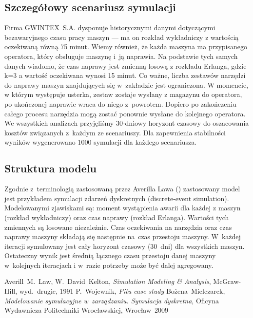 \documentclass[12pt, a4paper, oneside]{mwart} %
\begin{document}
\subsection{Szczegółowy scenariusz symulacji}

Firma GWINTEX~S.A. dysponuje historycznymi danymi dotyczącymi bezawaryjnego czasu pracy maszyn --- ma on rozkład wykładniczy z wartością oczekiwaną równą 75 minut. Wiemy również, że każda maszyna ma przypisanego operatora, który obsługuje maszynę i~ją naprawia. Na podstawie tych samych danych wiadomo, że czas naprawy jest zmienną losową z rozkładu Erlanga, gdzie k=3 a wartość oczekiwana wynosi 15 minut. Co ważne, liczba zestawów narzędzi do naprawy maszyn znajdujących się w~zakładzie jest ograniczona. W momencie, w którym występuje usterka, zestaw zostaje wysłany z magazynu do operatora, po ukończonej naprawie wraca do niego z~powrotem. Dopiero po zakończeniu całego procesu narzędzia mogą zostać ponownie wysłane do kolejnego operatora. We wszystkich analizach przyjęliśmy 30-dniowy horyzont czasowy do oszacowania kosztów związanych z~każdym ze scenariuszy. Dla zapewnienia stabilności wyników wygenerowano 1000 symulacji dla każdego scenariusza.

\subsection{Struktura modelu}
Zgodnie z~terminologią zastosowaną przez Averilla Lawa (\cite{law}) zastosowany model jest przykładem symulacji zdarzeń dyskretnych (discrete-event simulation). Modelowanymi zjawiskami są: moment wystąpienia awarii dla każdej z maszyn (rozkład wykładniczy) oraz czas naprawy (rozkład Erlanga). Wartości tych zmiennych są losowane niezależnie. Czas oczekiwania na narzędzia oraz czas naprawy maszyny składają się następnie na~czas przestoju maszyny. W~każdej iteracji symulowany jest cały horyzont czasowy (30~dni) dla wszystkich maszyn. Ostateczny wynik jest średnią łącznego czasu przestoju danej maszyny w~kolejnych iteracjach i w~razie potrzeby może być dalej agregowany.



\begin{thebibliography}{9}
Averill~M.~Law, W.~David~Kelton,
\emph{Simulation Modeling \& Analysis},
McGraw-Hill, wyd.~drugie, 1991
P.~Wojewnik, \emph{Pitu case study}
Bożena~Mielczarek, \emph{Modelowanie symulacyjne w~zarządzaniu. Symulacja dyskretna},
Oficyna Wydawnicza Politechniki Wrocławskiej, Wrocław~2009
\end{thebibliography}
\end{document}
